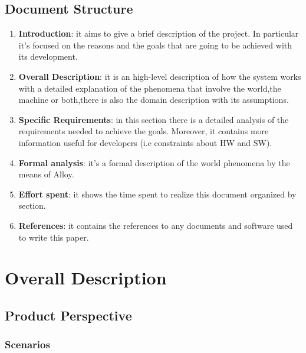 \documentclass{article}
\begin{document}
\subsection{Document Structure}
\begin{enumerate}
    \item \textbf{Introduction}: it aims to give a brief description of the project. In particular it’s focused on the reasons and the goals that are going to be achieved with its development.
    \item \textbf{Overall Description}: it is an high-level description of how the system works with a detailed explanation of the phenomena that involve the world,the machine or both,there is also the domain description with its assumptions.
    \item \textbf{Specific Requirements}: in this section there is a detailed analysis of the requirements needed to achieve the goals. Moreover, it contains more information useful for developers (i.e constraints about HW and SW).
    \item \textbf{Formal analysis}: it’s a formal description of the world phenomena by the means of Alloy.
    \item \textbf{Effort spent}: it shows the time spent to realize this document organized by section.
    \item \textbf{References}: it contains the references to any documents and software used to write this paper.
\end{enumerate}

\newpage

\section{Overall Description}

\subsection{Product Perspective}

\subsubsection{Scenarios}
\end{document}
